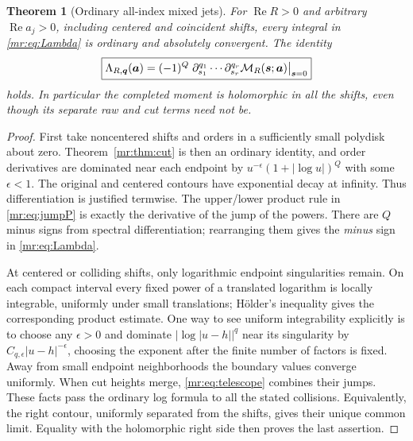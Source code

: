 \documentclass[11pt,letterpaper]{article}
\newtheorem{theorem}{Theorem}[section]
\theoremstyle{definition}\newtheorem{definition}[theorem]{Definition}
\theoremstyle{remark}\newtheorem{remark}[theorem]{Remark}
\newcommand{\Rea}{\operatorname{Re}}\newcommand{\Ima}{\operatorname{Im}}
\begin{document}
\begin{theorem}[Ordinary all-index mixed jets]\label{mr:thm:logs}
For $\Rea R>0$ and arbitrary $\Rea a_j>0$, including centered and
coincident shifts, every integral in \eqref{mr:eq:Lambda} is ordinary
and absolutely convergent. The identity
\begin{equation}\label{mr:eq:logjet}
 \boxed{\Lambda_{R,\boldsymbol q}(\boldsymbol a)
 =(-1)^Q\left.\partial_{s_1}^{q_1}\cdots\partial_{s_r}^{q_r}
             \mathcal M_R(\boldsymbol s;\boldsymbol a)\right|_{\boldsymbol s=0}}
\end{equation}
holds. In particular the completed moment is holomorphic in all the
shifts, even though its separate raw and cut terms need not be.
\end{theorem}
\begin{proof}
First take noncentered shifts and orders in a sufficiently small
polydisk about zero. Theorem~\ref{mr:thm:cut} is then an ordinary
identity, and order derivatives are dominated near each endpoint by
$u^{-\epsilon}(1+|\log u|)^Q$ with some $\epsilon<1$.
The original and centered contours have exponential decay at infinity.
Thus differentiation is justified termwise. The upper/lower product
rule in \eqref{mr:eq:jumpP} is exactly the derivative of the jump of the
powers. There are $Q$ minus signs from spectral differentiation;
rearranging them gives the \emph{minus} sign in \eqref{mr:eq:Lambda}.

At centered or colliding shifts, only logarithmic endpoint singularities
remain. On each compact interval every fixed power of a translated
logarithm is locally integrable, uniformly under small translations;
H\"older's inequality gives the corresponding product estimate.
One way to see uniform integrability explicitly is to choose any
$\epsilon>0$ and dominate $|\log|u-h||^q$ near its singularity by
$C_{q,\epsilon}|u-h|^{-\epsilon}$, choosing the exponent after the
finite number of factors is fixed. Away from small endpoint
neighborhoods the boundary values converge uniformly. When cut
heights merge, \eqref{mr:eq:telescope} combines their jumps. These facts
pass the ordinary log formula to all the stated collisions. Equivalently,
the right contour, uniformly separated from the shifts, gives their
unique common limit. Equality with the holomorphic right side then
proves the last assertion.
\end{proof}
\end{document}
